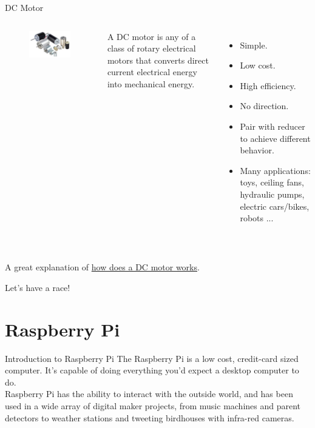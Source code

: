 \documentclass[12pt,letterpaper]{beamer}
\begin{document}
\begin{frame}{DC Motor}

\begin{columns}

\begin{figure}
    \includegraphics[width=.5\textwidth]{dc_motors}
\end{figure}

{\small A DC motor is any of a class of rotary electrical motors that converts direct current electrical energy into mechanical energy.} 
{\scriptsize 
\begin{itemize}
    \item Simple.
    \item Low cost.
    \item High efficiency.
    \item No direction.
    \item Pair with reducer to achieve different behavior.
    \item Many applications: toys, ceiling fans, hydraulic pumps, electric cars/bikes, robots ...
\end{itemize}
}

\end{columns}
\hfill \\
A great explanation of \href{https://youtu.be/CWulQ1ZSE3c}{how does a DC motor works}.

\end{frame}

\begin{frame}
    \centering Let's have a race!
\end{frame}

\section{Raspberry Pi}
\begin{frame}{Introduction to Raspberry Pi}
    The Raspberry Pi is a low cost, credit-card sized computer. It’s capable of doing everything you’d expect a desktop computer to do. \\
    Raspberry Pi  has the ability to interact with the outside world, and has been used in a wide array of digital maker projects, from music machines and parent detectors to weather stations and tweeting birdhouses with infra-red cameras. 
\end{frame}
\end{document}
